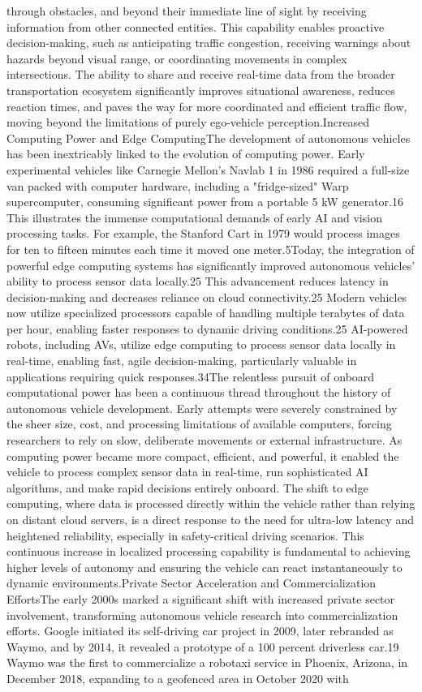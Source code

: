 through obstacles, and beyond their immediate line of sight by receiving information from other connected entities. This capability enables proactive decision-making, such as anticipating traffic congestion, receiving warnings about hazards beyond visual range, or coordinating movements in complex intersections. The ability to share and receive real-time data from the broader transportation ecosystem significantly improves situational awareness, reduces reaction times, and paves the way for more coordinated and efficient traffic flow, moving beyond the limitations of purely ego-vehicle perception.Increased Computing Power and Edge ComputingThe development of autonomous vehicles has been inextricably linked to the evolution of computing power. Early experimental vehicles like Carnegie Mellon's Navlab 1 in 1986 required a full-size van packed with computer hardware, including a "fridge-sized" Warp supercomputer, consuming significant power from a portable 5 kW generator.16 This illustrates the immense computational demands of early AI and vision processing tasks. For example, the Stanford Cart in 1979 would process images for ten to fifteen minutes each time it moved one meter.5Today, the integration of powerful edge computing systems has significantly improved autonomous vehicles' ability to process sensor data locally.25 This advancement reduces latency in decision-making and decreases reliance on cloud connectivity.25 Modern vehicles now utilize specialized processors capable of handling multiple terabytes of data per hour, enabling faster responses to dynamic driving conditions.25 AI-powered robots, including AVs, utilize edge computing to process sensor data locally in real-time, enabling fast, agile decision-making, particularly valuable in applications requiring quick responses.34The relentless pursuit of onboard computational power has been a continuous thread throughout the history of autonomous vehicle development. Early attempts were severely constrained by the sheer size, cost, and processing limitations of available computers, forcing researchers to rely on slow, deliberate movements or external infrastructure. As computing power became more compact, efficient, and powerful, it enabled the vehicle to process complex sensor data in real-time, run sophisticated AI algorithms, and make rapid decisions entirely onboard. The shift to edge computing, where data is processed directly within the vehicle rather than relying on distant cloud servers, is a direct response to the need for ultra-low latency and heightened reliability, especially in safety-critical driving scenarios. This continuous increase in localized processing capability is fundamental to achieving higher levels of autonomy and ensuring the vehicle can react instantaneously to dynamic environments.Private Sector Acceleration and Commercialization EffortsThe early 2000s marked a significant shift with increased private sector involvement, transforming autonomous vehicle research into commercialization efforts. Google initiated its self-driving car project in 2009, later rebranded as Waymo, and by 2014, it revealed a prototype of a 100 percent driverless car.19 Waymo was the first to commercialize a robotaxi service in Phoenix, Arizona, in December 2018, expanding to a geofenced area in October 2020 with 